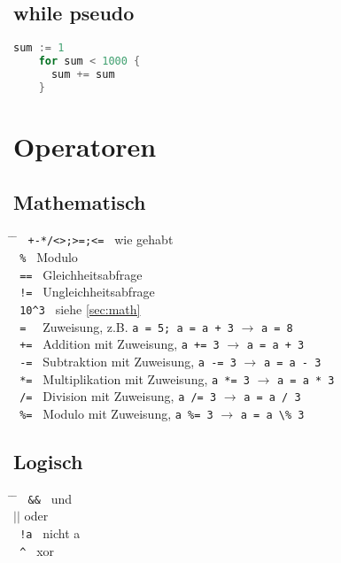 \documentclass[twoside,a4paper,12pt]{article}
\begin{document}
\subsection{while pseudo}
\begin{center}
  \begin{minipage}{1.0\textwidth}
    \begin{lstlisting}[language=Go]
    sum := 1 
    for sum < 1000 { 
      sum += sum
    }
    \end{lstlisting}
  \end{minipage}
\end{center}

\section{Operatoren}
\subsection{Mathematisch}
\begin{tabbing}
 \hspace{2mm} \= \hspace{30mm} \= \kill
 \> \verb| +-*/<>;>=;<= | \> wie gehabt \\ 
 \> \verb| % |\> Modulo \\ 
 \> \verb| == | \> Gleichheitsabfrage \\ 
 \> \verb| != | \> Ungleichheitsabfrage \\ 
 \> \verb| 10^3 | \> siehe \ref{sec:math} \\
 \> \verb| =  | \> Zuweisung, z.B. \verb|a = 5; a = a + 3| $\rightarrow$ \verb|a = 8| \\ 
 \> \verb| += | \> Addition mit Zuweisung, \verb|a += 3| $\rightarrow$ \verb|a = a + 3| \\ 
 \> \verb| -= | \> Subtraktion mit Zuweisung, \verb|a -= 3| $\rightarrow$ \verb|a = a - 3| \\ 
 \> \verb| *= | \> Multiplikation mit Zuweisung, \verb|a *= 3| $\rightarrow$ \verb|a = a * 3| \\ 
 \> \verb| /= | \> Division mit Zuweisung, \verb|a /= 3| $\rightarrow$ \verb|a = a / 3| \\ 
 \> \verb| %= | \> Modulo mit Zuweisung, \verb|a %= 3| $\rightarrow$ \verb|a = a \% 3| \\
\end{tabbing}

\subsection{Logisch}
\begin{tabbing}
 \hspace{2mm} \= \hspace{30mm} \= \kill
  \> \verb| && | \> und \\ 
  \> \hspace{1mm}  $||$ \> oder \\ 
  \> \verb| !a | \> nicht a \\
  \> \verb| ^ | \> xor \\
\end{tabbing}
\end{document}
